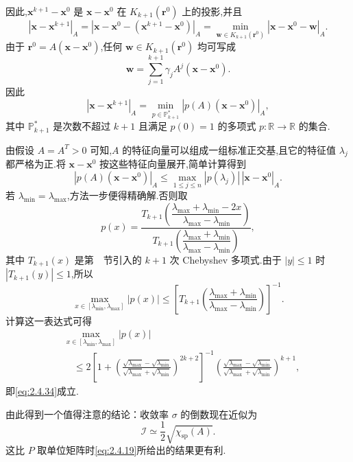 因此,\(\boldsymbol{x}^{k+1}-\boldsymbol{x}^0\) 是 \(\boldsymbol{x}-\boldsymbol{x}^0\) 在 \(K_{k+1}(\boldsymbol{r}^0)\) 上的投影,并且
\[
  |\boldsymbol{x}-\boldsymbol{x}^{k+1}|_A
    =|\boldsymbol{x}-\boldsymbol{x}^0-(\boldsymbol{x}^{k+1}-\boldsymbol{x}^0)|_A
    =\min_{\boldsymbol{w}\in K_{k+1}(\boldsymbol{r}^0)}|\boldsymbol{x}-\boldsymbol{x}^0-\boldsymbol{w}|_A.
\]
由于 \(\boldsymbol{r}^0=A(\boldsymbol{x}-\boldsymbol{x}^0)\),任何 \(\boldsymbol{w}\in K_{k+1}(\boldsymbol{r}^0)\) 均可写成
\[
  \boldsymbol{w}=\sum_{j=1}^{k+1}\gamma_j A^j(\boldsymbol{x}-\boldsymbol{x}^0).
\]
因此
\[
  |\boldsymbol{x}-\boldsymbol{x}^{k+1}|_A
    =\min_{p\in\mathbb P^*_{k+1}}|p(A)(\boldsymbol{x}-\boldsymbol{x}^0)|_A,
\]
其中 \(\mathbb P^*_{k+1}\) 是次数不超过 \(k+1\) 且满足 \(p(0)=1\) 的多项式 \(p\colon\mathbb R\to\mathbb R\) 的集合.

由假设 \(A=A^T>0\) 可知,\(A\) 的特征向量可以组成一组标准正交基,且它的特征值 \(\lambda_j\) 都严格为正.将 \(\boldsymbol{x}-\boldsymbol{x}^0\) 按这些特征向量展开,简单计算得到
\[
  |p(A)(\boldsymbol{x}-\boldsymbol{x}^0)|_A
    \le\max_{1\le j\le n}|p(\lambda_j)|\,|\boldsymbol{x}-\boldsymbol{x}^0|_A.
\]
若 \(\lambda_{\min}=\lambda_{\max}\),方法一步便得精确解.否则取
\[
  p(x)=\frac{T_{k+1}\!\left(\dfrac{\lambda_{\max}+\lambda_{\min}-2x}
                                 {\lambda_{\max}-\lambda_{\min}}\right)}
             {T_{k+1}\!\left(\dfrac{\lambda_{\max}+\lambda_{\min}}
                                 {\lambda_{\max}-\lambda_{\min}}\right)},
\]
其中 \(T_{k+1}(x)\) 是第~~节引入的 \(k+1\) 次 Chebyshev 多项式.由于 \(|y|\le1\) 时 \(|T_{k+1}(y)|\le1\),所以
\[
  \max_{x\in[\lambda_{\min},\lambda_{\max}]}|p(x)|
  \le\left[T_{k+1}\!\left(\frac{\lambda_{\max}+\lambda_{\min}}
                               {\lambda_{\max}-\lambda_{\min}}\right)\right]^{-1}.
\]
计算这一表达式可得
\[
  \begin{aligned}
    &\max_{x\in[\lambda_{\min},\lambda_{\max}]}|p(x)|\\
    &\quad\le 2\left[1+
       \left(\frac{\sqrt{\lambda_{\max}}-\sqrt{\lambda_{\min}}}
                  {\sqrt{\lambda_{\max}}+\sqrt{\lambda_{\min}}}\right)^{2k+2}\right]^{-1}
       \left(\frac{\sqrt{\lambda_{\max}}-\sqrt{\lambda_{\min}}}
                  {\sqrt{\lambda_{\max}}+\sqrt{\lambda_{\min}}}\right)^{k+1},
  \end{aligned}
\]
即\eqref{eq:2.4.34}成立.

由此得到一个值得注意的结论：收敛率 \(\sigma\) 的倒数现在近似为
\begin{equation}\label{eq:2.4.35}
  \mathcal I\simeq\frac12\sqrt{\chi_{\mathrm{sp}}(A)}.
\end{equation}
这比 \(P\) 取单位矩阵时\eqref{eq:2.4.19}所给出的结果更有利.

